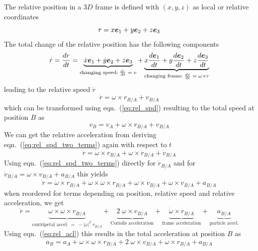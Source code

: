 The relative position in a $3D$ frame is defined with $(x,y,z)$ as local or relative
coordinates
\begin{equation}
    r = x \bm{e}_{1} + y \bm{e}_{2} + z \bm{e}_{3}
\end{equation}
The total change of the relative position has the following components
\begin{equation}
    \dot{r} = \frac{d {r}}{d {t}} = \underbrace{\dot{x} \bm{e}_{1} + \dot{y} \bm{e}_{2} + \dot{z} \bm{e}_{3}}
              _{\textrm{changing speed}: \; \frac{d {r}}{d {t}} \;=\; v}
            + \underbrace{x \frac{d {\bm{e}_{1}}}{d {t}} + y \frac{d {\bm{e}_{2}}}{d {t}} + z \frac{d {\bm{e}_{3}}}{d {t}}}
              _{\textrm{changing frame}: \; \frac{d {r}}{d {t}} \;=\; \omega \times r}
\end{equation}
leading to the relative speed $\dot{r}$
\begin{equation}
    \dot{r} = \omega \times r_{B/A} + v_{B/A}
    \label{eq:rel_spd_two_terms}
\end{equation}
which can be transformed using eqn.~(\ref{eq:rel_spd}) resulting to the total speed at
position $B$ as
\begin{equation}
    v_B = v_A + \omega \times r_{B/A} + v_{B/A} 
\end{equation}
We can get the relative acceleration from deriving eqn.~(\ref{eq:rel_spd_two_terms}) again
with respect to $t$
\begin{equation}
    \ddot{r} = \dot{\omega} \times r_{B/A} + \omega \times \dot{r}_{B/A} + \dot{v}_{B/A}
    \label{eq:rel_acl_three_terms}
\end{equation}
Using eqn.~(\ref{eq:rel_spd_two_terms}) directly for $\dot{r}_{B/A}$ and for
$\dot{v}_{B/A} = \omega \times v_{B/A} + a_{B/A}$ this yields
\begin{equation}
    \ddot{r} = \dot{\omega} \times r_{B/A} + \omega \times \omega \times r_{B/A}
             + \omega \times v_{B/A} + \omega \times v_{B/A} + a_{B/A}
    \label{eq:rel_acl_five_terms}
\end{equation}
when reordered for terms depending on position, relative speed and relative acceleration,
we get
\begin{equation}
    \ddot{r} = \underbrace{\omega \times \omega \times r_{B/A}}_
                          {\textrm{centripetal accel.}
                          \;=\; -|\omega|^2 \; r_{B/A}}
             + \underbrace{2\; \omega \times v_{B/A}}_
                          {\textrm{Coriolis acceleration}}
             + \underbrace{\dot{\omega} \times r_{B/A}}_
                          {\textrm{frame acceleration}}
             + \underbrace{a_{B/A}}_
                          {\textrm{particle accel.}}
    \label{eq:rel_acl_four_terms}
\end{equation}
Using eqn.~(\ref{eq:rel_acl}) this results in the total acceleration at position $B$ as
\begin{equation}
    a_B = a_A + \omega \times \omega \times r_{B/A}
              + 2\; \omega \times v_{B/A}
              + \dot{\omega} \times r_{B/A} + a_{B/A}
\end{equation}

